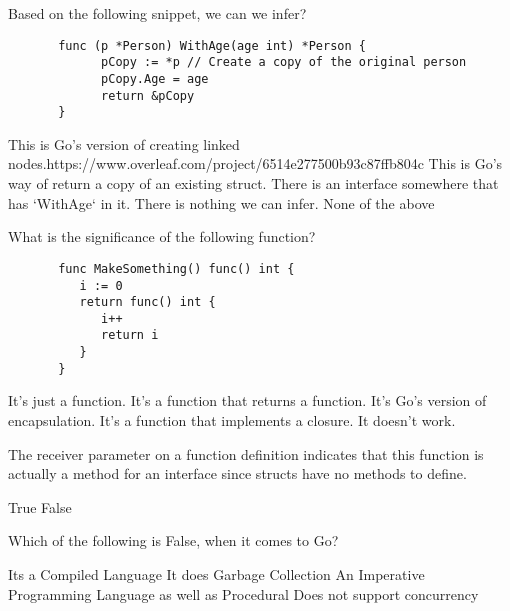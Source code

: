 \documentclass[12pt]{exam}
\begin{document}
\begin{questions}
\question[2]  Based on the following snippet, we can we infer?
\begin{mdframed}[backgroundcolor=bg]
\begin{verbatim}
       func (p *Person) WithAge(age int) *Person {
             pCopy := *p // Create a copy of the original person
             pCopy.Age = age
             return &pCopy
       }
\end{verbatim}
\end{mdframed}
\begin{choices}
\choice  This is Go's version of creating linked nodes.https://www.overleaf.com/project/6514e277500b93c87ffb804c
\CorrectChoice  This is Go's way of return a copy of an existing struct.
\choice  There is an interface somewhere that has `WithAge` in it.
\choice  There is nothing we can infer.
\choice  None of the above
\end{choices}
 
\question[2]  What is the significance of the following function?
\begin{mdframed}[backgroundcolor=bg]
\begin{verbatim}
       func MakeSomething() func() int {
          i := 0
          return func() int {
             i++
             return i
          }
       }
\end{verbatim}
\end{mdframed}
\begin{choices}
\choice  It's just a function.
\choice  It's a function that returns a function.
\choice  It's Go's version of encapsulation.
\CorrectChoice  It's a function that implements a closure.
\choice  It doesn't work.
\end{choices}
 
\question[2]  The receiver parameter on a function definition indicates that this function is actually a method for an interface since structs have no methods to define.
\begin{choices}
\choice  True
\CorrectChoice  False
\end{choices}
 
\question[2]  Which of the following is False, when it comes to Go?
\begin{choices}
\choice Its a Compiled Language
\choice It does Garbage Collection
\choice An Imperative Programming Language as well as Procedural
\CorrectChoice Does not support concurrency
\end{choices}

\end{questions}
\end{document}
